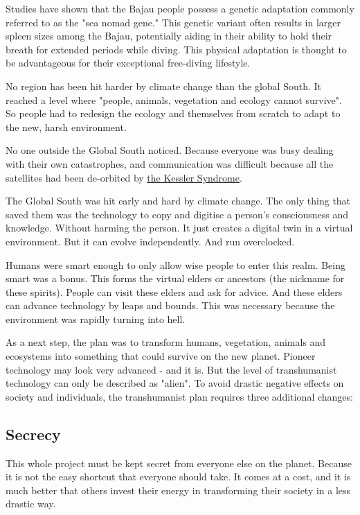 Studies have shown that the Bajau people possess a genetic adaptation commonly referred to as the "sea nomad gene." This genetic variant often results in larger spleen sizes among the Bajau, potentially aiding in their ability to hold their breath for extended periods while diving. This physical adaptation is thought to be advantageous for their exceptional free-diving lifestyle.

No region has been hit harder by climate change than the global South. It reached a level where "people, animals, vegetation and ecology cannot survive". So people had to redesign the ecology and themselves from scratch to adapt to the new, harsh environment.

No one outside the Global South noticed. Because everyone was busy dealing with their own catastrophes, and communication was difficult because all the satellites had been de-orbited by \hyperref[sec: Kessler Syndrome]{the Kessler Syndrome}.

The Global South was hit early and hard by climate change. The only thing that saved them was the technology to copy and digitise a person's consciousness and knowledge. Without harming the person. It just creates a digital twin in a virtual environment.
But it can evolve independently. And run overclocked.

Humans were smart enough to only allow wise people to enter this realm. Being smart was a bonus. This forms the virtual elders or ancestors (the nickname for these spirits). People can visit these elders and ask for advice.
And these elders can advance technology by leaps and bounds. This was necessary because the environment was rapidly turning into hell.

As a next step, the plan was to transform humans, vegetation, animals and ecosystems into something that could survive on the new planet. Pioneer technology may look very advanced - and it is. But the level of transhumanist technology can only be described as "alien". To avoid drastic negative effects on society and individuals, the transhumanist plan requires three additional changes:

\subsection{Secrecy}

This whole project must be kept secret from everyone else on the planet. Because it is not the easy shortcut that everyone should take. It comes at a cost, and it is much better that others invest their energy in transforming their society in a less drastic way.

